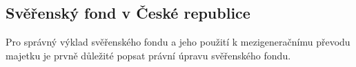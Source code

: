 \documentclass{article}
\begin{document}


\subsection{Svěřenský fond v České republice}




Pro správný výklad svěřenského fondu a jeho použití k mezigeneračnímu převodu majetku je prvně důležité popsat právní úpravu svěřenského fondu.\\
\end{document}
